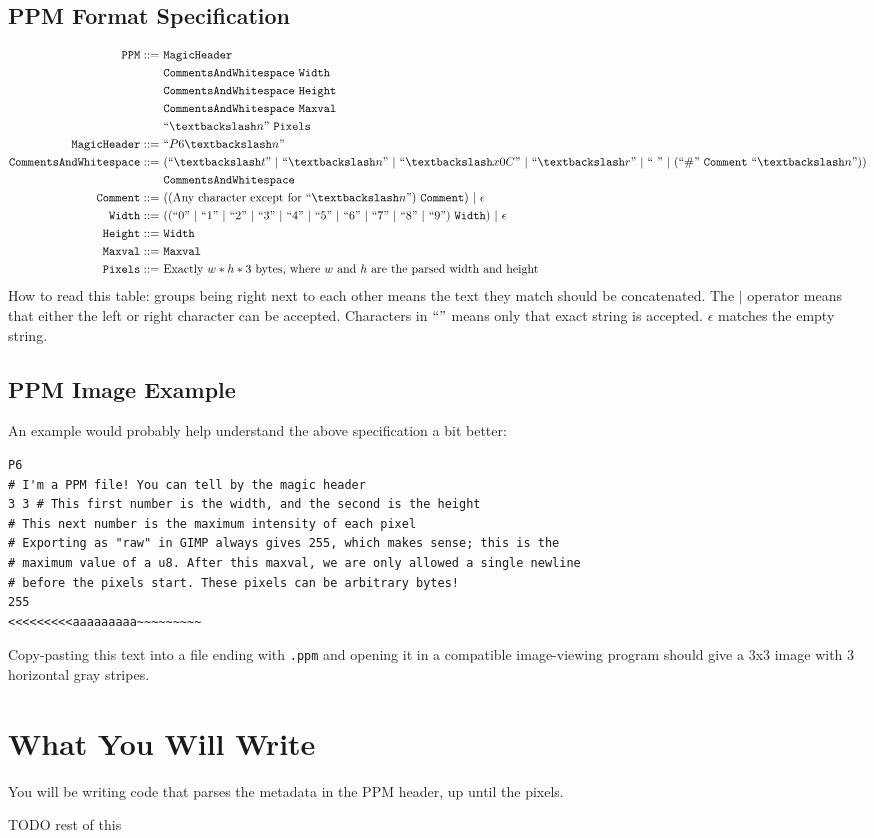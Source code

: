 \documentclass{article}
\begin{document}
\subsection*{PPM Format Specification}

\begin{align*}
    \texttt{PPM} ::=&\ \texttt{MagicHeader}\\
                    &\ \texttt{CommentsAndWhitespace}\ \texttt{Width}\\
                    &\ \texttt{CommentsAndWhitespace}\ \texttt{Height}\\
                    &\ \texttt{CommentsAndWhitespace}\ \texttt{Maxval}\\
                    &\ ``{\textbackslash}n"\ \texttt{Pixels}\\
    \texttt{MagicHeader} ::=&\ ``P6{\textbackslash}n"\\
    \texttt{CommentsAndWhitespace} ::=&\ (``{\textbackslash}t"\ |\ ``{\textbackslash}n"\ |\ ``{\textbackslash}x0C"\ |\ ``{\textbackslash}r"\ |\ ``\ "\ |\ (``\#"\ \texttt{Comment}\ ``{\textbackslash}n"))\\
    &\ \texttt{CommentsAndWhitespace}\\
    \texttt{Comment} ::=&\ ((\text{Any character except for } ``{\textbackslash}n")\ \texttt{Comment})\ |\ \epsilon\\
    \texttt{Width} ::=&\ ((``0"\ |\ ``1"\ |\ ``2"\ |\ ``3"\ |\ ``4"\ |\ ``5"\ |\ ``6"\ |\ ``7"\ |\ ``8"\ |\ ``9")\ \texttt{Width})\ |\ \epsilon\\
    \texttt{Height} ::=&\ \texttt{Width}\\
    \texttt{Maxval} ::=&\ \texttt{Maxval}\\
    \texttt{Pixels} ::=&\ \text{Exactly $w*h*3$ bytes, where $w$ and $h$ are the parsed width and height}
\end{align*}
How to read this table: groups being right next to each other means the text they match should be concatenated. The $|$ operator means that either the left or right character can be accepted. Characters in $``"$ means only that exact string is accepted. $\epsilon$ matches the empty string.

\subsection*{PPM Image Example}
An example would probably help understand the above specification a bit better:
\begin{verbatim}
P6
# I'm a PPM file! You can tell by the magic header
3 3 # This first number is the width, and the second is the height
# This next number is the maximum intensity of each pixel
# Exporting as "raw" in GIMP always gives 255, which makes sense; this is the
# maximum value of a u8. After this maxval, we are only allowed a single newline
# before the pixels start. These pixels can be arbitrary bytes!
255
<<<<<<<<<aaaaaaaaa~~~~~~~~~
\end{verbatim}
Copy-pasting this text into a file ending with \texttt{.ppm} and opening it in a compatible image-viewing program should give a 3x3 image with 3 horizontal gray stripes.

\section*{What You Will Write}
You will be writing code that parses the metadata in the PPM header, up until the pixels.

TODO rest of this
\end{document}
